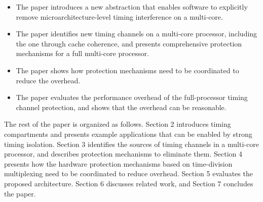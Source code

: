 \begin{itemize}
\item The paper introduces a new abstraction that enables software to
explicitly remove microarchitecture-level timing interference on a multi-core.
\item The paper identifies new timing channels on a multi-core processor,
including the one through cache coherence, and presents
comprehensive protection mechanisms for a full multi-core processor.
\item The paper shows how protection mechanisms need to be coordinated to
reduce the overhead.%
\item The paper evaluates the performance overhead of the full-processor
timing channel protection, and shows that the overhead can be reasonable.
\end{itemize}

The rest of the paper is organized as follows.
Section 2 introduces timing compartments and 
presents example applications that can be enabled by strong timing isolation.
Section 3 identifies the sources of timing channels in a multi-core processor, and
describes protection mechanisms to eliminate them. 
Section 4 presents how the hardware protection mechanisms based on time-division
multiplexing need to be coordinated to reduce overhead.
Section 5 evaluates the proposed architecture. Section 6 discusses related
work, and Section 7 concludes the paper.
